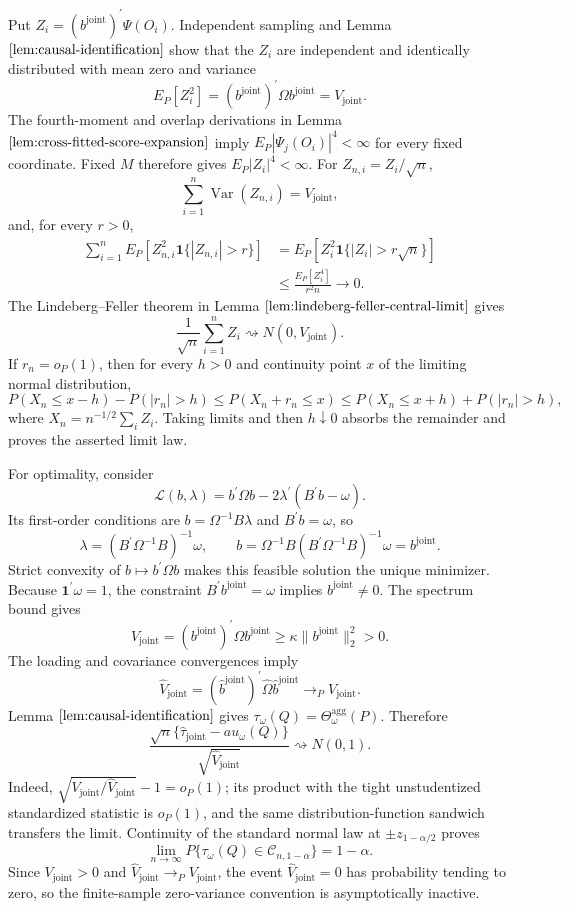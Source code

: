 Put \(Z_i=(b^{\mathrm{joint}})^{\prime}\Psi(O_i)\). Independent sampling and Lemma \(\ref{lem:causal-identification}\) show that the \(Z_i\) are independent and identically distributed with mean zero and variance
\[
 E_P[Z_i^2]=(b^{\mathrm{joint}})^{\prime}\Omega
 b^{\mathrm{joint}}=V_{\mathrm{joint}}.
\]
The fourth-moment and overlap derivations in Lemma \(\ref{lem:cross-fitted-score-expansion}\) imply \(E_P|\Psi_j(O_i)|^4<\infty\) for every fixed coordinate. Fixed \(M\) therefore gives \(E_P|Z_i|^4<\infty\). For \(Z_{n,i}=Z_i/\sqrt n\),
\[
 \sum_{i=1}^n\operatorname{Var}(Z_{n,i})=V_{\mathrm{joint}},
\]
and, for every \(r>0\),
\[
\begin{aligned}
 \sum_{i=1}^nE_P[Z_{n,i}^2\mathbf 1\{|Z_{n,i}|>r\}]
 &=E_P[Z_i^2\mathbf 1\{|Z_i|>r\sqrt n\}]\\
 &\le \frac{E_P[Z_i^4]}{r^2n}\longrightarrow0.
\end{aligned}
\]
The Lindeberg--Feller theorem in Lemma \(\ref{lem:lindeberg-feller-central-limit}\) gives
\[
 \frac1{\sqrt n}\sum_{i=1}^nZ_i
 \rightsquigarrow N(0,V_{\mathrm{joint}}).
\]
If \(r_n=o_P(1)\), then for every \(h>0\) and continuity point \(x\) of the limiting normal distribution,
\[
 P(X_n\le x-h)-P(|r_n|>h)
 \le P(X_n+r_n\le x)
 \le P(X_n\le x+h)+P(|r_n|>h),
\]
where \(X_n=n^{-1/2}\sum_iZ_i\). Taking limits and then \(h\downarrow0\) absorbs the remainder and proves the asserted limit law.

For optimality, consider
\[
 \mathcal L(b,\lambda)=b^{\prime}\Omega b
 -2\lambda^{\prime}(B^{\prime}b-\omega).
\]
Its first-order conditions are \(b=\Omega^{-1}B\lambda\) and \(B^{\prime}b=\omega\), so
\[
 \lambda=(B^{\prime}\Omega^{-1}B)^{-1}\omega,
 \qquad
 b=\Omega^{-1}B(B^{\prime}\Omega^{-1}B)^{-1}\omega
 =b^{\mathrm{joint}}.
\]
Strict convexity of \(b\mapsto b^{\prime}\Omega b\) makes this feasible solution the unique minimizer. Because \(\mathbf 1^{\prime}\omega=1\), the constraint \(B^{\prime}b^{\mathrm{joint}}=\omega\) implies \(b^{\mathrm{joint}}\ne0\). The spectrum bound gives
\[
 V_{\mathrm{joint}}
 =(b^{\mathrm{joint}})^{\prime}\Omega b^{\mathrm{joint}}
 \ge\kappa\|b^{\mathrm{joint}}\|_2^2>0.
\]
The loading and covariance convergences imply
\[
 \widehat V_{\mathrm{joint}}
 =(\widehat b^{\mathrm{joint}})^{\prime}
 \widehat\Omega\widehat b^{\mathrm{joint}}
 \to_PV_{\mathrm{joint}}.
\]
Lemma \(\ref{lem:causal-identification}\) gives \(\tau_\omega(Q)=\Theta_\omega^{\mathrm{agg}}(P)\). Therefore
\[
 \frac{\sqrt n\{\widehat\tau_{\mathrm{joint}}-  au_\omega(Q)\}}
 {\sqrt{\widehat V_{\mathrm{joint}}}}
 \rightsquigarrow N(0,1).
\]
Indeed, \(\sqrt{V_{\mathrm{joint}}/\widehat V_{\mathrm{joint}}}-1=o_P(1)\); its product with the tight unstudentized standardized statistic is \(o_P(1)\), and the same distribution-function sandwich transfers the limit. Continuity of the standard normal law at \(\pm z_{1-\alpha/2}\) proves
\[
 \lim_{n\to\infty}P\{\tau_\omega(Q)\in\mathcal C_{n,1-\alpha}\}
 =1-\alpha.
\]
Since \(V_{\mathrm{joint}}>0\) and \(\widehat V_{\mathrm{joint}}\to_PV_{\mathrm{joint}}\), the event \(\widehat V_{\mathrm{joint}}=0\) has probability tending to zero, so the finite-sample zero-variance convention is asymptotically inactive.

